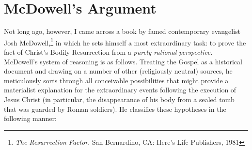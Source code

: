 \chapter*{McDowell's Argument}

Not long ago, however, I came across a book by famed contemporary evangelist Josh McDowell,\footnote{\emph{The Resurrection Factor}. San Bernardino, CA: Here's Life Publishers, 1981} in which he sets himself a most extraordinary task: to prove the fact of Christ's Bodily Resurrection from a \emph{purely rational perspective.} McDowell's system of reasoning is as follows. Treating the Gospel as a historical document and drawing on a number of other (religiously neutral) sources, he meticulously sorts through all conceivable possibilities that might provide a materialist explanation for the extraordinary events following the execution of Jesus Christ (in particular, the disappearance of his body from a sealed tomb that was guarded by Roman soldiers). He classifies these hypotheses in the following manner:

